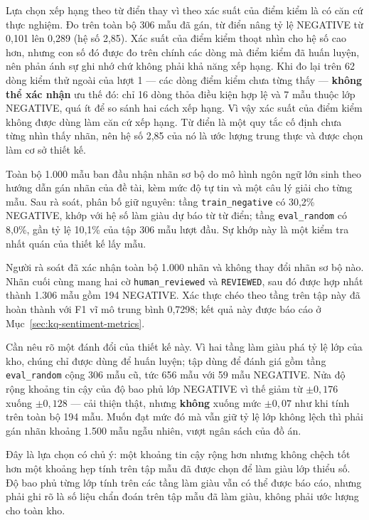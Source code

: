 Lựa chọn xếp hạng theo từ điển thay vì theo xác suất của điểm kiểm là có căn cứ thực nghiệm.
Đo trên toàn bộ 306 mẫu đã gán, từ điển nâng tỷ lệ NEGATIVE từ 0,101 lên 0,289 (hệ số 2,85).
Xác suất của điểm kiểm thoạt nhìn cho hệ số cao hơn, nhưng con số đó được đo trên chính các
dòng mà điểm kiểm đã huấn luyện, nên phản ánh sự ghi nhớ chứ không phải khả năng xếp hạng.
Khi đo lại trên 62 dòng kiểm thử ngoài của lượt 1 --- các dòng điểm kiểm chưa từng thấy ---
\textbf{không thể xác nhận} ưu thế đó: chỉ 16 dòng thỏa điều kiện hợp lệ và 7 mẫu thuộc lớp
NEGATIVE, quá ít để so sánh hai cách xếp hạng. Vì vậy xác suất của điểm kiểm không được dùng
làm căn cứ xếp hạng. Từ điển là một quy tắc cố định chưa từng nhìn thấy nhãn, nên hệ số 2,85
của nó là ước lượng trung thực và được chọn làm cơ sở thiết kế.

Toàn bộ 1.000 mẫu ban đầu nhận nhãn sơ bộ do mô hình ngôn ngữ lớn sinh theo hướng dẫn
gán nhãn của đề tài, kèm mức độ tự tin và một câu lý giải cho từng mẫu. Sau rà soát,
phân bố giữ nguyên: tầng \texttt{train\_negative} có 30,2\% NEGATIVE, khớp với hệ số
làm giàu dự báo từ từ điển; tầng \texttt{eval\_random} có 8,0\%, gần tỷ lệ 10,1\%
của tập 306 mẫu lượt đầu. Sự khớp này là một kiểm tra nhất quán của thiết kế lấy mẫu.

Người rà soát đã xác nhận toàn bộ 1.000 nhãn và không thay đổi nhãn sơ bộ nào. Nhãn
cuối cùng mang hai cờ \texttt{human\_reviewed} và \texttt{REVIEWED}, sau đó được hợp
nhất thành 1.306 mẫu gồm 194 NEGATIVE. Xác thực chéo theo tầng trên tập này đã hoàn
thành với F1 vĩ mô trung bình 0,7298; kết quả này được báo cáo ở
Mục~\ref{sec:kq-sentiment-metrics}.

Cần nêu rõ một đánh đổi của thiết kế này. Vì hai tầng làm giàu phá tỷ lệ lớp của kho, chúng
chỉ được dùng để huấn luyện; tập dùng để đánh giá gồm tầng \texttt{eval\_random} cộng 306 mẫu
cũ, tức 656 mẫu với 59 mẫu NEGATIVE. Nửa độ rộng khoảng tin cậy của độ bao phủ lớp NEGATIVE
vì thế giảm từ $\pm0{,}176$ xuống $\pm0{,}128$ --- cải thiện thật, nhưng \textbf{không} xuống
mức $\pm0{,}07$ như khi tính trên toàn bộ 194 mẫu. Muốn đạt mức đó mà vẫn giữ tỷ lệ lớp không
lệch thì phải gán nhãn khoảng 1.500 mẫu ngẫu nhiên, vượt ngân sách của đồ án.

Đây là lựa chọn có chủ ý: một khoảng tin cậy rộng hơn nhưng không chệch tốt hơn một khoảng
hẹp tính trên tập mẫu đã được chọn để làm giàu lớp thiểu số. Độ bao phủ từng lớp tính trên
các tầng làm giàu vẫn có thể được báo cáo, nhưng phải ghi rõ là số liệu chẩn đoán trên tập
mẫu đã làm giàu, không phải ước lượng cho toàn kho.


